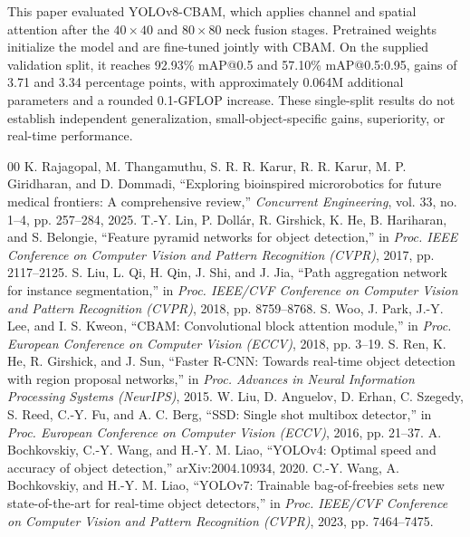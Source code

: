 \documentclass[conference]{IEEEtran}
\begin{document}
This paper evaluated YOLOv8-CBAM, which applies channel and spatial attention after the $40\times40$ and $80\times80$ neck fusion stages. Pretrained weights initialize the model and are fine-tuned jointly with CBAM. On the supplied validation split, it reaches 92.93\% mAP@0.5 and 57.10\% mAP@0.5:0.95, gains of 3.71 and 3.34 percentage points, with approximately 0.064M additional parameters and a rounded 0.1-GFLOP increase. These single-split results do not establish independent generalization, small-object-specific gains, superiority, or real-time performance.

\footnotesize
\begin{thebibliography}{00}
 K. Rajagopal, M. Thangamuthu, S. R. R. Karur, R. R. Karur, M. P. Giridharan, and D. Dommadi, ``Exploring bioinspired microrobotics for future medical frontiers: A comprehensive review,'' \textit{Concurrent Engineering}, vol. 33, no. 1--4, pp. 257--284, 2025.
 T.-Y. Lin, P. Doll\'ar, R. Girshick, K. He, B. Hariharan, and S. Belongie, ``Feature pyramid networks for object detection,'' in \textit{Proc. IEEE Conference on Computer Vision and Pattern Recognition (CVPR)}, 2017, pp. 2117--2125.
 S. Liu, L. Qi, H. Qin, J. Shi, and J. Jia, ``Path aggregation network for instance segmentation,'' in \textit{Proc. IEEE/CVF Conference on Computer Vision and Pattern Recognition (CVPR)}, 2018, pp. 8759--8768.
 S. Woo, J. Park, J.-Y. Lee, and I. S. Kweon, ``CBAM: Convolutional block attention module,'' in \textit{Proc. European Conference on Computer Vision (ECCV)}, 2018, pp. 3--19.
 S. Ren, K. He, R. Girshick, and J. Sun, ``Faster R-CNN: Towards real-time object detection with region proposal networks,'' in \textit{Proc. Advances in Neural Information Processing Systems (NeurIPS)}, 2015.
 W. Liu, D. Anguelov, D. Erhan, C. Szegedy, S. Reed, C.-Y. Fu, and A. C. Berg, ``SSD: Single shot multibox detector,'' in \textit{Proc. European Conference on Computer Vision (ECCV)}, 2016, pp. 21--37.
 A. Bochkovskiy, C.-Y. Wang, and H.-Y. M. Liao, ``YOLOv4: Optimal speed and accuracy of object detection,'' arXiv:2004.10934, 2020.
 C.-Y. Wang, A. Bochkovskiy, and H.-Y. M. Liao, ``YOLOv7: Trainable bag-of-freebies sets new state-of-the-art for real-time object detectors,'' in \textit{Proc. IEEE/CVF Conference on Computer Vision and Pattern Recognition (CVPR)}, 2023, pp. 7464--7475.

\end{thebibliography}
\end{document}
